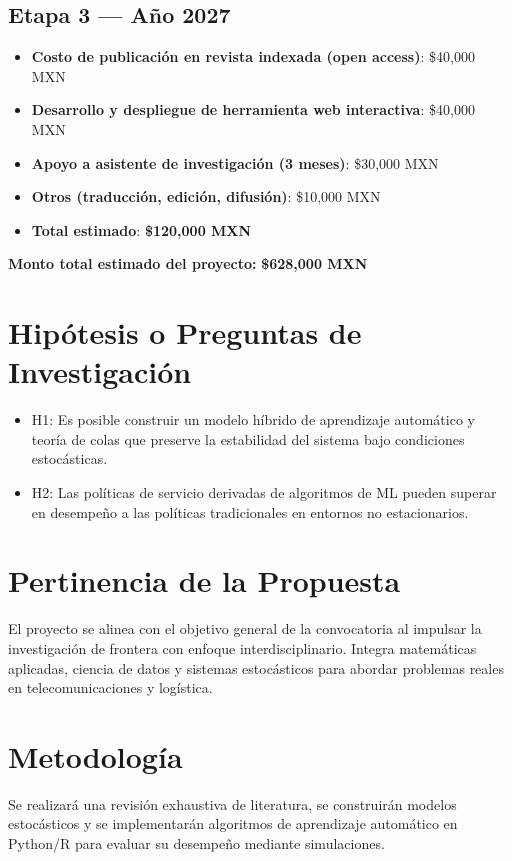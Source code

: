 \documentclass[12pt]{article}
\begin{document}
\subsection*{Etapa 3 — Año 2027}
\begin{itemize}
  \item \textbf{Costo de publicación en revista indexada (open access)}: \$40,000 MXN
  \item \textbf{Desarrollo y despliegue de herramienta web interactiva}: \$40,000 MXN
  \item \textbf{Apoyo a asistente de investigación (3 meses)}: \$30,000 MXN
  \item \textbf{Otros (traducción, edición, difusión)}: \$10,000 MXN
  \item \textbf{Total estimado}: \textbf{\$120,000 MXN}
\end{itemize}

\textbf{Monto total estimado del proyecto:} \textbf{\$628,000 MXN}




\section{Hipótesis o Preguntas de Investigación}
\begin{itemize}
  \item H1: Es posible construir un modelo híbrido de aprendizaje automático y teoría de colas que preserve la estabilidad del sistema bajo condiciones estocásticas.
  \item H2: Las políticas de servicio derivadas de algoritmos de ML pueden superar en desempeño a las políticas tradicionales en entornos no estacionarios.
\end{itemize}

\section{Pertinencia de la Propuesta}
El proyecto se alinea con el objetivo general de la convocatoria al impulsar la investigación de frontera con enfoque interdisciplinario. Integra matemáticas aplicadas, ciencia de datos y sistemas estocásticos para abordar problemas reales en telecomunicaciones y logística.

\section{Metodología}
Se realizará una revisión exhaustiva de literatura, se construirán modelos estocásticos y se implementarán algoritmos de aprendizaje automático en Python/R para evaluar su desempeño mediante simulaciones.
\end{document}
